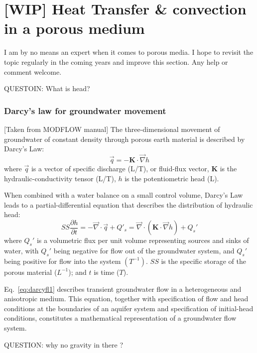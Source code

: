 
\chapter{[WIP] Heat Transfer \& convection in a porous medium} %

{\color{orange} I am by no means an expert when it comes to porous media. I hope to revisit the topic regularly in the coming years and improve this section. Any help or comment welcome.}


QUESTOIN: What is head? 

\subsection{Darcy's law for groundwater movement}

[Taken from MODFLOW manual]
The three-dimensional movement of groundwater of constant density through porous earth material is
described by Darcy's Law:
\[
\vec{q} = - {\bm K}\cdot \vec\nabla h
\]
where $\vec{q}$ is a vector of specific discharge (L/T), or fluid-flux vector,
${\bm K}$ is the hydraulic-conductivity tensor (L/T),
$h$ is the potentiometric head (L).

When combined with a water balance on a small control volume, Darcy's
Law leads to a partial-differential equation that describes the distribution of hydraulic head:
\begin{equation}
SS \frac{\partial h}{\partial t} = - \vec\nabla\cdot \vec{q} + Q'_s = \vec\nabla \cdot ({\bm K} \cdot \vec\nabla h) + Q_s'
\label{eq:darcyfl1}
\end{equation}
where $Q_s'$ is a volumetric flux per unit volume representing sources and sinks of water, with $Q_s'$ 
being negative for flow out of the groundwater system, and $Q_s'$ being positive for flow into the system $(T^{-1})$.
$SS$ is the specific storage of the porous material ($L^{-1}$); and $t$ is time ($T$).

Eq.~\eqref{eq:darcyfl1} describes transient groundwater flow in a 
heterogeneous and anisotropic medium. This equation, together with specification of flow and head conditions
at the boundaries of an aquifer system and specification of initial-head conditions, constitutes a mathematical
representation of a groundwater flow system.

QUESTION: why no gravity in there ?




